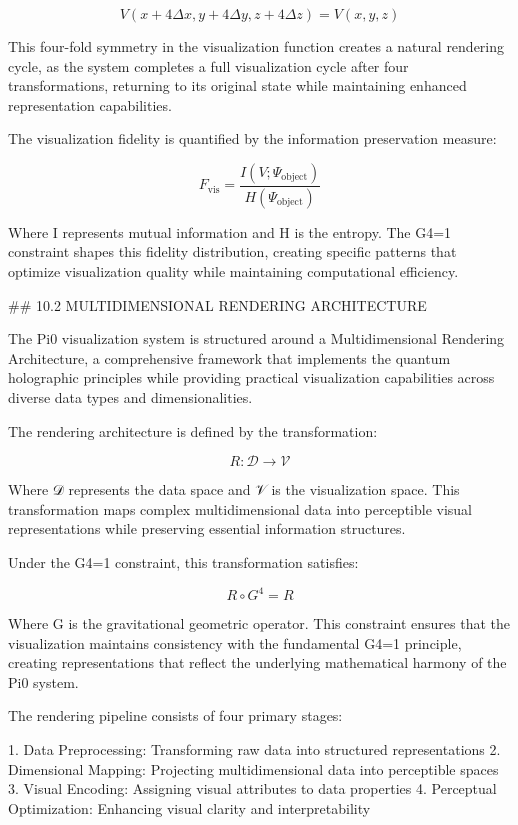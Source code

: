 $$V(x+4\Delta x, y+4\Delta y, z+4\Delta z) = V(x, y, z)$$

This four-fold symmetry in the visualization function creates a natural rendering cycle, as the system completes a full visualization cycle after four transformations, returning to its original state while maintaining enhanced representation capabilities.

The visualization fidelity is quantified by the information preservation measure:

$$F_{\text{vis}} = \frac{I(V; \Psi_{\text{object}})}{H(\Psi_{\text{object}})}$$

Where I represents mutual information and H is the entropy. The G4=1 constraint shapes this fidelity distribution, creating specific patterns that optimize visualization quality while maintaining computational efficiency.

## 10.2 MULTIDIMENSIONAL RENDERING ARCHITECTURE

The Pi0 visualization system is structured around a Multidimensional Rendering Architecture, a comprehensive framework that implements the quantum holographic principles while providing practical visualization capabilities across diverse data types and dimensionalities.

The rendering architecture is defined by the transformation:

$$R: \mathcal{D} \rightarrow \mathcal{V}$$

Where 𝒟 represents the data space and 𝒱 is the visualization space. This transformation maps complex multidimensional data into perceptible visual representations while preserving essential information structures.

Under the G4=1 constraint, this transformation satisfies:

$$R \circ G^4 = R$$

Where G is the gravitational geometric operator. This constraint ensures that the visualization maintains consistency with the fundamental G4=1 principle, creating representations that reflect the underlying mathematical harmony of the Pi0 system.

The rendering pipeline consists of four primary stages:

1. Data Preprocessing: Transforming raw data into structured representations
2. Dimensional Mapping: Projecting multidimensional data into perceptible spaces
3. Visual Encoding: Assigning visual attributes to data properties
4. Perceptual Optimization: Enhancing visual clarity and interpretability

